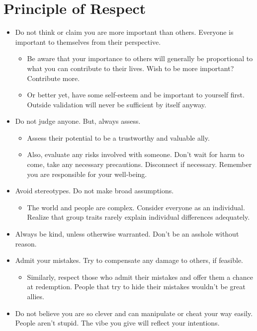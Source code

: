 \documentclass[
]{book}
\providecommand{\tightlist}{%
  \setlength{\itemsep}{0pt}\setlength{\parskip}{0pt}}
\begin{document}
\hypertarget{principle-of-respect}{%
\section{Principle of Respect}\label{principle-of-respect}}

\begin{itemize}
\tightlist
\item
  Do not think or claim you are more important than others.
  Everyone is important to themselves from their perspective.

  \begin{itemize}
  \tightlist
  \item
    Be aware that your importance to others will generally be proportional to what you can contribute to their lives. Wish to be more important? Contribute more.
  \item
    Or better yet, have some self-esteem and be important to yourself first. Outside validation will never be sufficient by itself anyway.
  \end{itemize}
\item
  Do not judge anyone. But, always assess.

  \begin{itemize}
  \tightlist
  \item
    Assess their potential to be a trustworthy and valuable ally.
  \item
    Also, evaluate any risks involved with someone. Don't wait for harm to come, take any necessary precautions. Disconnect if necessary. Remember you are responsible for your well-being.
  \end{itemize}
\item
  Avoid stereotypes. Do not make broad assumptions.

  \begin{itemize}
  \tightlist
  \item
    The world and people are complex. Consider everyone as an individual. Realize that group traits rarely explain individual differences adequately.
  \end{itemize}
\item
  Always be kind, unless otherwise warranted. Don't be an asshole without reason.
\item
  Admit your mistakes. Try to compensate any damage to others, if feasible.

  \begin{itemize}
  \tightlist
  \item
    Similarly, respect those who admit their mistakes and offer them a chance at redemption. People that try to hide their mistakes wouldn't be great allies.
  \end{itemize}
\item
  Do not believe you are so clever and can manipulate or cheat your way easily. People aren't stupid. The vibe you give will reflect your intentions.


\end{itemize}
\end{document}
